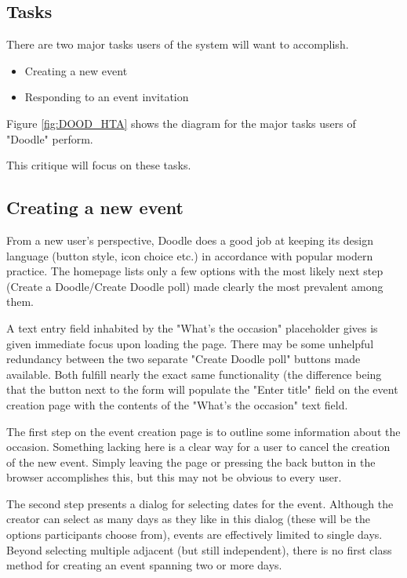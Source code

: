 \documentclass{sigchi}
\begin{document}
\subsection{Tasks}

There are two major tasks users of the system will want
to accomplish.

\begin{itemize}
\item Creating a new event
\item Responding to an event invitation
\end{itemize}


Figure \ref{fig:DOOD_HTA} shows the diagram for the major tasks users of "Doodle" perform.

This critique will focus on these tasks.

\subsection{Creating a new event}

From a new user's perspective, Doodle does a good job at keeping its
design language (button style, icon choice etc.) in accordance with
popular modern practice. The homepage lists only a few options with
the most likely next step (Create a Doodle/Create Doodle poll) made
clearly the most prevalent among them.

A text entry field inhabited by the "What's the occasion"
placeholder gives is given immediate focus upon loading the
page. There may be some unhelpful redundancy between the two
separate "Create Doodle poll" buttons made available. Both fulfill
nearly the exact same functionality (the difference being that the
button next to the form will populate the "Enter title" field on the
event creation page with the contents of the "What's the occasion"
text field.


The first step on the event creation page is to outline some
information about the occasion. Something lacking here is a clear
way for a user to cancel the creation of the new event. Simply
leaving the page or pressing the back button in the browser
accomplishes this, but this may not be obvious to every user.

The second step presents a dialog for selecting dates for the
event. Although the creator can select as many days as they like in
this dialog (these will be the options participants choose from),
events are effectively limited to single days. Beyond selecting
multiple adjacent (but still independent), there is no first class
method for creating an event spanning two or more days. 
\end{document}
